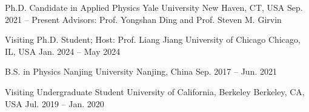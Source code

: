 \begin{cventries}
  \cventry
    {Ph.D. Candidate in Applied Physics}
    {Yale University}
    {New Haven, CT, USA}
    {Sep. 2021 -- Present}
    {Advisors: Prof. Yongshan Ding and Prof. Steven M. Girvin}

  \cventry
    {Visiting Ph.D. Student; Host: Prof. Liang Jiang}
    {University of Chicago}
    {Chicago, IL, USA}
    {Jan. 2024 -- May 2024}
    {}

  \cventry
    {B.S. in Physics}
    {Nanjing University}
    {Nanjing, China}
    {Sep. 2017 -- Jun. 2021}
    {}

  \cventry
    {Visiting Undergraduate Student}
    {University of California, Berkeley}
    {Berkeley, CA, USA}
    {Jul. 2019 -- Jan. 2020}
    {}
\end{cventries}
